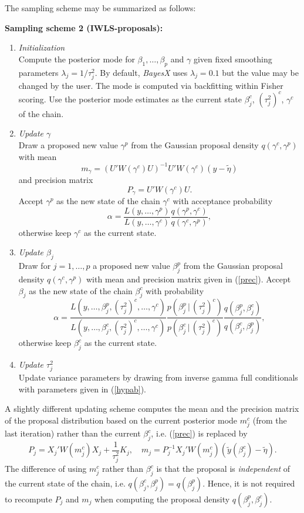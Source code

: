 The sampling scheme may be summarized as follows:

{\bf Sampling scheme 2 (IWLS-proposals):}

\begin{enumerate}
\item {\em Initialization} \\
Compute the posterior mode for $\beta_1,\dots,\beta_p$ and
$\gamma$ given fixed smoothing parameters $\lambda_j =
1/\tau^2_j$. By default, {\em BayesX} uses $\lambda_j = 0.1$ but
the value may be changed by the user. The mode is computed via
backfitting within Fisher scoring. Use the posterior mode
estimates as the current state $\beta_j^c$, $(\tau_j^2)^c$,
$\gamma^c$ of the chain.
\item {\em Update $\gamma$} \\
Draw a proposed new value $\gamma^p$ from the Gaussian proposal
density $q(\gamma^c,\gamma^p)$ with mean
$$
m_{\gamma} = (U' W(\gamma^c) U)^{-1}U' W(\gamma^c) (y-\tilde{\eta}
)
$$
and precision matrix
$$
P_{\gamma} = U' W(\gamma^c) U.
$$
Accept $\gamma^p$ as the new state of the chain $\gamma^c$ with
acceptance probability
$$
\alpha = \frac{ L(y,\dots,\gamma^p)} {L(y,\dots,\gamma^c)} \frac{
q(\gamma^p,\gamma^c)}{q(\gamma^c,\gamma^p)},
$$
otherwise keep $\gamma^c$ as the current state.
\item {\em Update $\beta_j$} \\
Draw for $j=1,\dots,p$ a proposed new value $\beta_j^p$ from the
Gaussian proposal density $q(\gamma^c,\gamma^p)$ with mean and
precision matrix given in (\ref{prec}). Accept $\beta_j$ as the
new state of the chain $\beta_j^c$ with probability
$$
\alpha = \frac{
L(y,\dots,\beta^{p}_j,(\tau_j^2)^{c},\dots,\gamma^c)}
{L(y,\dots,\beta^{c}_j,(\tau_j^2)^{c},\dots,\gamma^c)}
\frac{p(\beta_j^p \, | \, (\tau_j^2)^c)}{p(\beta_j^c \, | \,
(\tau_j^2)^c)} \frac{
q(\beta_j^p,\beta_j^c)}{q(\beta_j^c,\beta_j^p)},
$$
otherwise keep $\beta_j^c$ as the current state.
\item {\em Update $\tau^2_j$} \\
Update variance parameters by drawing from inverse gamma full
conditionals with parameters given in (\ref{hypab}).
\end{enumerate}

A slightly different updating scheme computes the mean and the
precision matrix of the proposal distribution based on the current
posterior mode $m_j^c$ (from the last iteration) rather than the
current $\beta_j^c$, i.e. (\ref{prec}) is replaced by
\begin{equation}
\label{precmode} P_j = X_j'W(m_j^c)X_j + \frac{1}{\tau^2_j}K_j,
\quad m_j = P_j^{-1}X_j'W(m_j^c)(\tilde{y}(\beta^c_j) -
\tilde{\eta}).
\end{equation}
The difference of using $m_j^c$ rather than $\beta_j^c$ is that
the proposal is {\em independent} of the current state of the
chain, i.e. $q(\beta_j^c,\beta_j^p) = q(\beta_j^p)$. Hence, it is
not required to recompute $P_j$ and $m_j$ when computing the
proposal density $q(\beta_j^p,\beta_j^c)$.

